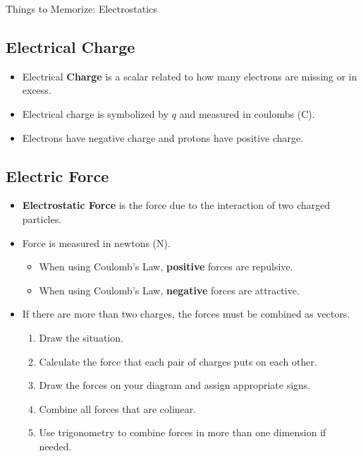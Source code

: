 \documentclass[letterpaper, 12pt]{article}
\begin{document}
	


\begin{center}Things to Memorize: Electrostatics
\end{center}

\subsection*{Electrical Charge}
\begin{itemize}
	\item Electrical \textbf{Charge} is a scalar related to how many electrons are missing or in excess.  
	\item Electrical charge is symbolized by $q$ and measured in coulombs (C).
	\item Electrons have negative charge and protons have positive charge.  
	
\end{itemize}
\subsection*{Electric Force}
	\begin{itemize}
		\item \textbf{Electrostatic Force} is the force due to the interaction of two charged particles.
		\item Force is measured in newtons (N). 
			\begin{itemize}
				\item When using Coulomb's Law, \textbf{positive} forces are repulsive.
				\item When using Coulomb's Law, \textbf{negative} forces are attractive.
			\end{itemize}
		\item If there are more than two charges, the forces must be combined as vectors.
			\begin{enumerate}
				\item Draw the situation.  
				\item Calculate the force that each pair of charges puts on each other.
				\item Draw the forces on your diagram and assign appropriate signs.
				\item Combine all forces that are colinear. 
				\item Use trigonometry to combine forces in more than one dimension if needed.
			\end{enumerate}
	\end{itemize}
\end{document}
